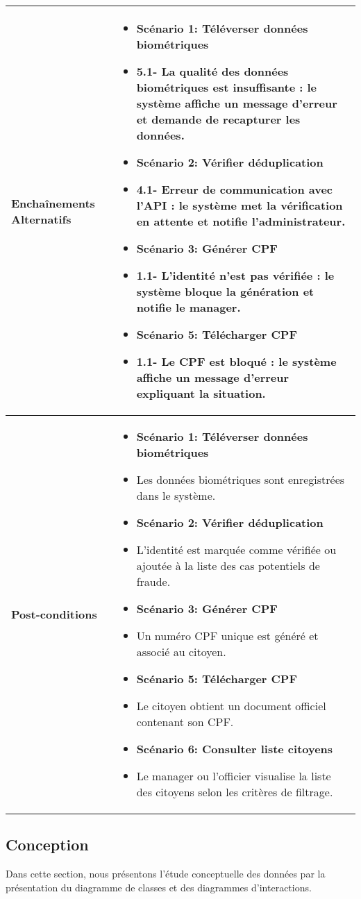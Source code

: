 \begin{longtable}{|>{\arraybackslash}p{4.2cm}|>{\arraybackslash}p{12.5cm}|}
\hline
\textbf{Enchaînements Alternatifs} &
\begin{itemize}[label=]
  \item\textbf{Scénario 1: Téléverser données biométriques}
 \item{5.1-} La qualité des données biométriques est insuffisante : le système affiche un message d'erreur et demande de recapturer les données.
 \item\textbf{Scénario 2: Vérifier déduplication}
 \item{4.1-} Erreur de communication avec l'API : le système met la vérification en attente et notifie l'administrateur.
 \item\textbf{Scénario 3: Générer CPF}
 \item{1.1-} L'identité n'est pas vérifiée : le système bloque la génération et notifie le manager.
 \item\textbf{Scénario 5: Télécharger CPF}
 \item{1.1-} Le CPF est bloqué : le système affiche un message d'erreur expliquant la situation.
\end{itemize} \\
\hline
\textbf{Post-conditions } &
\begin{itemize}[label=]
  \item\textbf{Scénario 1: Téléverser données biométriques}
 \item Les données biométriques sont enregistrées dans le système.
 \item\textbf{Scénario 2: Vérifier déduplication}
 \item L'identité est marquée comme vérifiée ou ajoutée à la liste des cas potentiels de fraude.
 \item\textbf{Scénario 3: Générer CPF}
 \item Un numéro CPF unique est généré et associé au citoyen.
 \item\textbf{Scénario 5: Télécharger CPF}
 \item Le citoyen obtient un document officiel contenant son CPF.
 \item\textbf{Scénario 6: Consulter liste citoyens}
 \item Le manager ou l'officier visualise la liste des citoyens selon les critères de filtrage.
\end{itemize} \\
\end{longtable}

\subsection{Conception}
Dans cette section, nous présentons l'étude conceptuelle des données par la présentation du
diagramme de classes et des diagrammes d'interactions.
